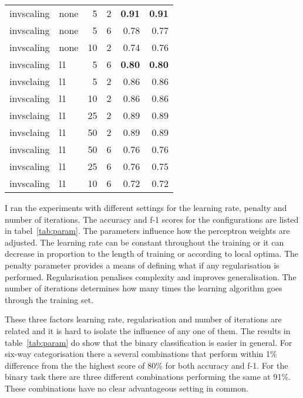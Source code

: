 \documentclass[11pt]{article}
\begin{document}
\begin{table}[ht]
\begin{tabular}{llrrrr}
    \hline
    invscaling & none       & 5    & 2    & \textbf{0.91} & \textbf{0.91} \\
    invscaling & none       & 5    & 6    & 0.78 & 0.77 \\
    invscaling & none       & 10   & 2    & 0.74 & 0.76 \\
    \cline{2-6}
    invscaling & l1         & 5    & 6    & \textbf{0.80} & \textbf{0.80} \\
    invsclaing & l1         & 5    & 2    & 0.86 & 0.86 \\
    invscaling & l1         & 10   & 2    & 0.86 & 0.86 \\
    invsclaing & l1         & 25   & 2    & 0.89 & 0.89 \\
    invsclaing & l1         & 50   & 2    & 0.89 & 0.89 \\
    invscaling & l1         & 50   & 6    & 0.76 & 0.76 \\
    invscaling & l1         & 25   & 6    & 0.76 & 0.75 \\
    invscaling & l1         & 10   & 6    & 0.72 & 0.72 \\
  \end{tabular}
\end{table}

I ran the experiments with different settings for the learning rate, penalty and number of iterations. The accuracy and f-1 scores for the configurations are listed in tabel~\ref{tab:param}. The parameters influence how the perceptron weights are adjusted. The learning rate can be constant throughout the training or it can decrease in proportion to the length of training or according to local optima. The penalty parameter provides a means of defining what if any regularisation is performed. Regularisation penalises complexity and improves generalisation. The number of iterations determines how many times the learning algorithm goes through the training set.

These three factors learning rate, regularisation and number of iterations are related and it is hard to isolate the influence of any one of them. The results in table~\ref{tab:param} do show that the binary classification is easier in general. For six-way categorisation there a several combinations that perform within 1\% difference from the the highest score of 80\% for both accuracy and f-1. For the binary task there are three different combinations performing the same at 91\%. These combinations have no clear advantageous setting in common.
\end{document}
